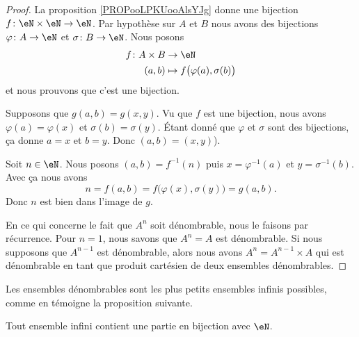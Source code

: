 \begin{proof}
	La proposition \ref{PROPooLPKUooAlsYJg} donne une bijection \(f \colon \eN\times \eN\to \eN  \). Par hypothèse sur \( A\) et \( B\) nous avons des bijections \(\varphi \colon A\to \eN  \) et \(\sigma \colon B\to \eN  \). Nous posons
	\begin{equation}
		\begin{aligned}
			f\colon A\times B & \to \eN                                    \\
			(a,b)             & \mapsto f\big( \varphi(a), \sigma(b) \big)
		\end{aligned}
	\end{equation}
	et nous prouvons que c'est une bijection.
	\begin{subproof}
		\spitem[Injectif]
		Supposons que \( g(a,b)=g(x,y)\). Vu que \( f\) est une bijection, nous avons \( \varphi(a)=\varphi(x)\) et \( \sigma(b)=\sigma(y)\). Étant donné que  \( \varphi\) et \( \sigma\) sont des bijections, ça donne \( a=x\) et \( b=y\). Donc \( (a,b)=(x,y)\)).

		\spitem[Surjectif]
		Soit \( n\in \eN\). Nous posons \( (a,b)=f^{-1}(n)\) puis \( x=\varphi^{-1}(a)\) et \( y=\sigma^{-1}(b)\). Avec ça nous avons
		\begin{equation}
			n=f(a,b)=f\big( \varphi(x),\sigma(y) \big)=g(a,b).
		\end{equation}
		Donc \( n\) est bien dans l'image de \( g\).
	\end{subproof}

	En ce qui concerne le fait que \( A^n\) soit dénombrable, nous le faisons par récurrence. Pour \( n=1\), nous savons que \( A^n=A\) est dénombrable. Si nous supposons que \( A^{n-1}\) est dénombrable, alors nous avons \( A^n=A^{n-1}\times A\) qui est dénombrable en tant que produit cartésien de deux ensembles dénombrables.
\end{proof}

\begin{normaltext}	\label{NORMooDenombrablesPlusPetitsInfinis}
	Les ensembles dénombrables sont les plus petits ensembles infinis possibles, comme en témoigne la proposition suivante.
\end{normaltext}

\begin{proposition}      \label{PROPooUIPAooCUEFme}
	Tout ensemble infini contient une partie en bijection avec \( \eN\).
\end{proposition}

